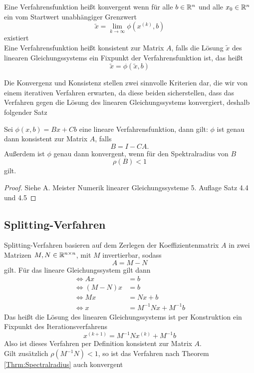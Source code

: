 \documentclass{scrartcl}
\begin{document}
\begin{definition}\cite{Iterative}
    Eine Verfahrensfunktion heißt konvergent wenn für alle \(b \in \mathbb{R}^n\) und alle \(x_0 \in \mathbb{R}^n\) ein vom Startwert unabhängiger Grenzwert
    \[\tilde{x} = \lim_{k \to \infty} \phi(x^{(k)},b)\]
    existiert\\ Eine Verfahrensfunktion heißt konsistent zur Matrix \(A\),
    falls die Lösung \(\tilde{x}\) des linearen Gleichungssystems ein Fixpunkt
    der Verfahrensfunktion ist, das heißt
    \[\tilde{x} = \phi(\tilde{x},b)\]
\end{definition}
Die Konvergenz und Konsistenz stellen zwei sinnvolle Kriterien dar, die wir von einem iterativen Verfahren erwarten, da diese beiden sicherstellen, dass das Verfahren gegen die Lösung des linearen Gleichungssystems konvergiert, deshalb folgender Satz

\begin{theorem}\cite{Iterative}
    Sei \(\phi(x,b)=Bx+Cb\) eine lineare Verfahrensfunktion, dann gilt:
    \(\phi\) ist genau dann konsistent zur Matrix \(A\), falls
    \[B=I-CA.\]
    Außerdem ist \(\phi\) genau dann konvergent, wenn für den Spektralradius
    von \(B\)
    \[\rho(B)<1\]\label{Thrm:Spectralradius}
    gilt.
\end{theorem}
\begin{proof}
    Siehe A. Meister Numerik linearer Gleichungssysteme 5. Auflage Satz 4.4 und 4.5
\end{proof}
\subsection{Splitting-Verfahren}
Splitting-Verfahren basieren auf dem Zerlegen der Koeffizientenmatrix \(A\) in
zwei Matrizen \(M, N \in \mathbb{R}^{n \times n}\), mit \(M\) invertierbar, sodass
\[A = M-N\]
gilt. Für das lineare Gleichungssystem gilt dann
\begin{align*}
    \iff Ax     & = b                  \\
    \iff (M-N)x & = b                  \\
    \iff Mx     & = Nx + b             \\
    \iff x      & = M^{-1}Nx + M^{-1}b
\end{align*}\cite{SOR}
Das heißt die Lösung des linearen Gleichungssystems ist per Konstruktion ein Fixpunkt des Iterationsverfahrens
\[x^{(k+1)}= M^{-1}Nx^{(k)} + M^{-1}b\]
Also ist dieses Verfahren per Definition konsistent zur Matrix \(A\). \\ Gilt
  zusätzlich \(\rho(M^{-1}N) < 1\), so ist das Verfahren nach Theorem
  \ref{Thrm:Spectralradius} auch konvergent
\end{document}
